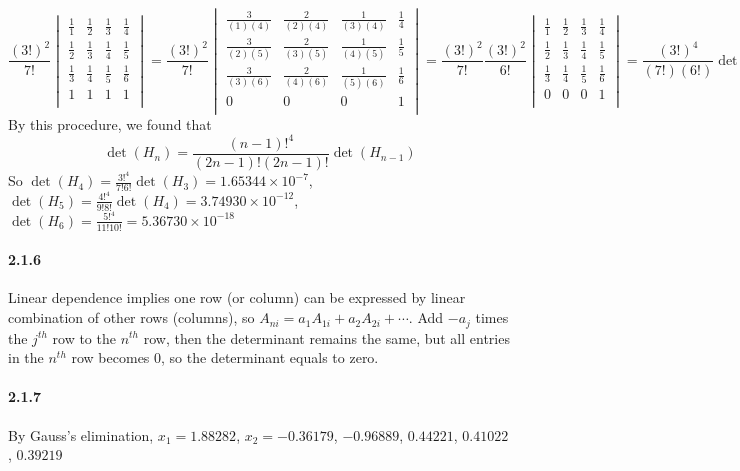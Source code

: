 \documentclass[a4paper]{article}
\begin{document}
\[
\frac{(3!)^2}{7!}
\begin{vmatrix}
\frac{1}{1}&\frac{1}{2}&\frac{1}{3}&\frac{1}{4}\\
\frac{1}{2}&\frac{1}{3}&\frac{1}{4}&\frac{1}{5}\\ 
\frac{1}{3}&\frac{1}{4}&\frac{1}{5}&\frac{1}{6}\\
1&1&1&1\\
\end{vmatrix}
=
\frac{(3!)^2}{7!}
\begin{vmatrix}
\frac{3}{(1)(4)}&\frac{2}{(2)(4)}&\frac{1}{(3)(4)}&\frac{1}{4}\\
\frac{3}{(2)(5)}&\frac{2}{(3)(5)}&\frac{1}{(4)(5)}&\frac{1}{5}\\ 
\frac{3}{(3)(6)}&\frac{2}{(4)(6)}&\frac{1}{(5)(6)}&\frac{1}{6}\\
0&0&0&1\\
\end{vmatrix}
=
\frac{(3!)^2}{7!}\frac{(3!)^2}{6!}
\begin{vmatrix}
\frac{1}{1}&\frac{1}{2}&\frac{1}{3}&\frac{1}{4}\\
\frac{1}{2}&\frac{1}{3}&\frac{1}{4}&\frac{1}{5}\\ 
\frac{1}{3}&\frac{1}{4}&\frac{1}{5}&\frac{1}{6}\\
0&0&0&1\\
\end{vmatrix}
=
\frac{(3!)^4}{(7!)(6!)}\det(H_3)
\]
By this procedure, we found that
\[
\det(H_n)=\frac{(n-1)!^4}{(2n-1)!(2n-1)!}\det(H_{n-1})
\]
So $\det(H_4)=\frac{3!^4}{7!6!}\det(H_3)=1.65344\times10^{-7}$, $\det(H_5)=\frac{4!^4}{9!8!}\det(H_4)=3.74930\times10^{-12}$, $\det(H_6)=\frac{5!^4}{11!10!}=5.36730\times10^{-18}$

\paragraph{2.1.6}
Linear dependence implies one row (or column) can be expressed by linear combination of other rows (columns), so $A_{ni}=a_1A_{1i}+a_2A_{2i}+\cdots$. Add $-a_j$ times the $j^{th}$ row to the $n^{th}$  row, then the determinant remains the same, but all entries in the $n^{th}$ row becomes $0$, so the determinant equals to zero.

\paragraph{2.1.7}
By Gauss's elimination, $x_1=1.88282$, $x_2=-0.36179$, $-0.96889$, $0.44221$, $0.41022$, $0.39219$
\end{document}
